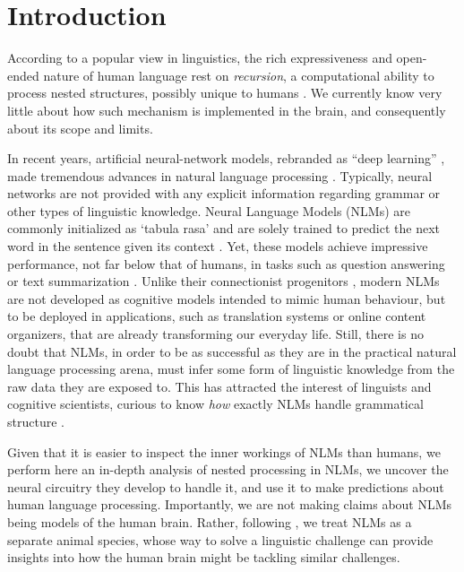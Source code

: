 \section{Introduction}

According to a popular view in linguistics, the rich expressiveness
and open-ended nature of human language rest on \emph{recursion}, a
computational ability to process nested structures, possibly unique to
humans \citep{Chomsky:1957, Hauser:etal:2002, Dehaene:etal:2015}. We
currently know very little about how such mechanism is implemented in
the brain, and consequently about its scope and limits.

In recent years, artificial neural-network models, rebranded as ``deep learning'' \citep{LeCun:etal:2015}, made tremendous advances in natural language processing \citep{Goldberg:2017}. Typically, neural networks are not provided with any explicit information regarding grammar or other types of linguistic knowledge. Neural Language Models (NLMs) are commonly initialized as `tabula rasa' and are solely trained to predict the next word in the sentence given its context \citep{Elman:1990}. Yet, these models achieve impressive performance, not far below that of humans, in tasks such as question answering or text summarization \citep{Radford:etal:2019}. Unlike their connectionist progenitors \cite{Rumelhart:etal:1986,Rumelhart:etal:1986b}, modern NLMs are not developed as cognitive models intended to mimic human behaviour, but to be deployed in applications, such as translation systems or online content organizers, that are already transforming our everyday life. Still, there is no doubt that NLMs, in order to be as successful as they are in the practical natural language processing arena, must infer some form of linguistic knowledge from the raw data they are exposed to. This has attracted the interest of linguists and cognitive scientists, curious to know  \textit{how} exactly NLMs handle grammatical structure \citep[see][for a survey]{Linzen:Baroni:2020}.

Given that it is easier to inspect the inner workings of NLMs than humans, we perform here an in-depth analysis of nested processing in NLMs, we uncover the neural circuitry they develop to handle it, and use it to make predictions about human language processing. Importantly, we are not making claims about NLMs being models of the human brain. Rather, following \citet{McCloskey:1991}, we treat NLMs as a separate animal species, whose way to solve a linguistic challenge can provide insights into how the human brain might be tackling similar challenges.

